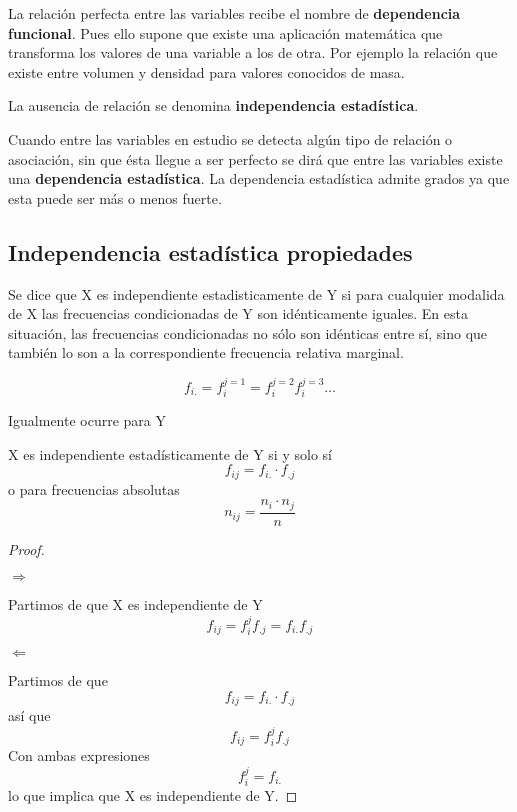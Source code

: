 \documentclass{article}
\theoremstyle{definition}
\begin{document}
 La relación perfecta entre las variables recibe el nombre de
 \textbf{dependencia funcional}. Pues ello supone que existe una aplicación
 matemática que transforma los valores de una variable a los de otra. Por
 ejemplo la relación que existe entre volumen y densidad para valores conocidos
 de masa.

 La ausencia de relación se denomina \textbf{independencia estadística}.

 Cuando entre las variables en estudio se detecta algún tipo de relación o
 asociación, sin que ésta llegue a ser perfecto se dirá que entre las variables
 existe una \textbf{dependencia estadística}. La dependencia estadística admite
 grados ya que esta puede ser más o menos fuerte.

 \subsection{Independencia estadística propiedades}

 Se dice que X es independiente estadisticamente de Y si para cualquier
 modalida de X las frecuencias condicionadas de Y son idénticamente iguales. En
 esta situación, las frecuencias condicionadas no sólo son idénticas entre sí,
 sino que también lo son a la correspondiente frecuencia relativa marginal.

 $$ f_{i.} = f_i^{j=1} = f_i^{j=2} f_i^{j=3} \ldots $$

 Igualmente ocurre para Y

 \vspace{0.5cm}

\begin{theorem}

X es independiente estadísticamente de Y si y solo sí $$ f_{ij} = f_{i.} \cdot
f_{.j} $$ o para frecuencias absolutas $$n_{ij} = \frac{n_i \cdot n_j}{n}$$
\end{theorem}

\begin{proof} $ $\newline

$\boxed{\Rightarrow}$

$ $\newline Partimos de que X es independiente de Y  $$f_{ij} = f_i^j f_{.j} =
f_{i.} f_{.j}$$

$\boxed{\Leftarrow}$

$ $\newline Partimos de que $$ f_{ij} = f_{i.} \cdot f_{.j} $$ así que $$ f_{ij} =
f_i^j f_{.j} $$ Con ambas expresiones $$f_i^j = f_{i.} $$ lo que implica que X
es independiente de Y. \end{proof}
\end{document}
